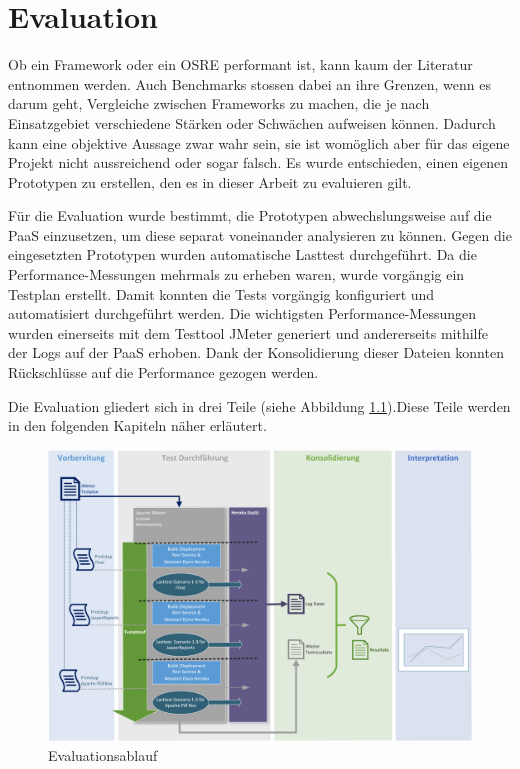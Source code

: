 \documentclass[main.tex]{subfiles}
\begin{document}
\chapter{Evaluation}

Ob ein Framework oder ein OSRE performant ist, kann kaum der Literatur entnommen werden. Auch Benchmarks stossen dabei an ihre Grenzen, wenn es darum geht, Vergleiche zwischen Frameworks zu machen, die je nach Einsatzgebiet verschiedene Stärken oder Schwächen aufweisen können. Dadurch kann eine objektive Aussage zwar wahr sein, sie ist womöglich aber für das eigene Projekt nicht aussreichend oder sogar falsch. Es wurde entschieden, einen eigenen Prototypen zu erstellen, den es in dieser Arbeit zu evaluieren gilt. 

Für die Evaluation wurde bestimmt, die Prototypen abwechslungsweise auf die PaaS einzusetzen, um diese separat voneinander analysieren zu können. Gegen die eingesetzten Prototypen wurden automatische Lasttest durchgeführt. Da die Performance-Messungen mehrmals zu erheben waren, wurde vorgängig ein Testplan erstellt. Damit konnten die Tests vorgängig konfiguriert und automatisiert durchgeführt werden. Die wichtigsten Performance-Messungen wurden einerseits mit dem Testtool JMeter generiert und andererseits mithilfe der Logs auf der PaaS erhoben. Dank der Konsolidierung dieser Dateien konnten Rückschlüsse auf die Performance gezogen werden.

Die Evaluation gliedert sich in drei Teile  (siehe Abbildung \ref{figure:evaluationsAblauf}).Diese Teile werden in den folgenden Kapiteln näher erläutert.

\begin{figure}[h]
\includegraphics[width=\textwidth]{mainpart/3_methodik_evaluation_img/Testablauf.png}
 \caption{Evaluationsablauf}
 \label{figure:evaluationsAblauf}
\end{figure}
\end{document}
